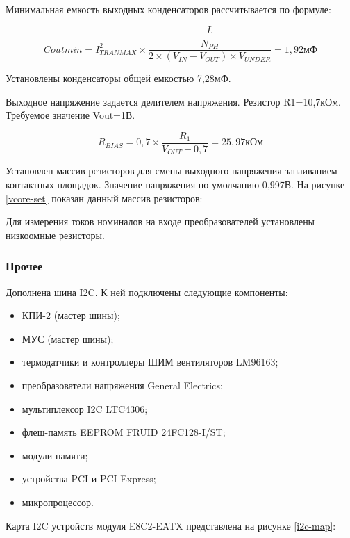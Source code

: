 Минимальная емкость выходных конденсаторов рассчитывается по формуле:

\begin{equation}
Coutmin = I_{TRANMAX}^2 \times \frac{\dfrac{L}{N_{PH}}}{2 \times (V_{IN} - V_{OUT}) \times V_{UNDER}} = 1,92 \text{мФ}
\end{equation}

Установлены конденсаторы общей емкостью 7,28мФ.

Выходное напряжение задается делителем напряжения. Резистор R1=10,7кОм. Требуемое значение Vout=1В.

\begin{equation}
R_{BIAS} = 0,7 \times \frac{R_{1}}{V_{OUT}-0,7} = 25,97\text{кОм}
\end{equation}

Установлен массив резисторов для смены выходного напряжения запаиванием контактных площадок. Значение напряжения по умолчанию 0,997В. На рисунке \ref{vcore-set} показан данный массив резисторов:


Для измерения токов номиналов на входе преобразователей установлены низкоомные резисторы.

\subsubsection{Прочее}

Дополнена шина I2C. К ней подключены следующие компоненты:
\begin{itemize}
	\item КПИ-2 (мастер шины);
	\item МУС (мастер шины);
	\item термодатчики и контроллеры ШИМ вентиляторов LM96163;
	\item преобразователи напряжения General Electrics;
	\item мультиплексор I2C LTC4306;
	\item флеш-память EEPROM FRUID 24FC128-I/ST;
	\item модули памяти;
	\item устройства PCI и PCI Express;
	\item микропроцессор.
\end{itemize}

Карта I2C устройств модуля E8C2-EATX представлена на рисунке \ref{i2c-map}:


